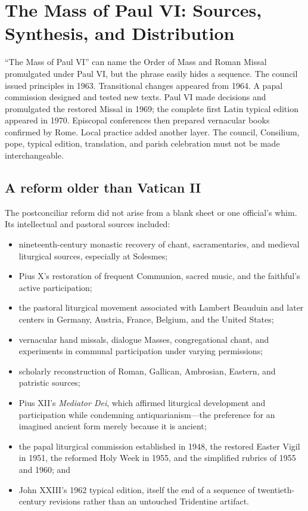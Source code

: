 \section{The Mass of Paul VI: Sources, Synthesis, and Distribution}

“The Mass of Paul VI” can name the Order of Mass and Roman Missal promulgated under Paul VI, but the phrase easily hides a sequence. The council issued principles in 1963. Transitional changes appeared from 1964. A papal commission designed and tested new texts. Paul VI made decisions and promulgated the restored Missal in 1969; the complete first Latin typical edition appeared in 1970. Episcopal conferences then prepared vernacular books confirmed by Rome. Local practice added another layer. The council, Consilium, pope, typical edition, translation, and parish celebration must not be made interchangeable.

\subsection{A reform older than Vatican II}

The postconciliar reform did not arise from a blank sheet or one official's whim. Its intellectual and pastoral sources included:

\begin{itemize}
\item nineteenth-century monastic recovery of chant, sacramentaries, and medieval liturgical sources, especially at Solesmes;
\item Pius X's restoration of frequent Communion, sacred music, and the faithful's active participation;
\item the pastoral liturgical movement associated with Lambert Beauduin and later centers in Germany, Austria, France, Belgium, and the United States;
\item vernacular hand missals, dialogue Masses, congregational chant, and experiments in communal participation under varying permissions;
\item scholarly reconstruction of Roman, Gallican, Ambrosian, Eastern, and patristic sources;
\item Pius XII's \emph{Mediator Dei}, which affirmed liturgical development and participation while condemning antiquarianism—the preference for an imagined ancient form merely because it is ancient;
\item the papal liturgical commission established in 1948, the restored Easter Vigil in 1951, the reformed Holy Week in 1955, and the simplified rubrics of 1955 and 1960; and
\item John XXIII's 1962 typical edition, itself the end of a sequence of twentieth-century revisions rather than an untouched Tridentine artifact.
\end{itemize}

